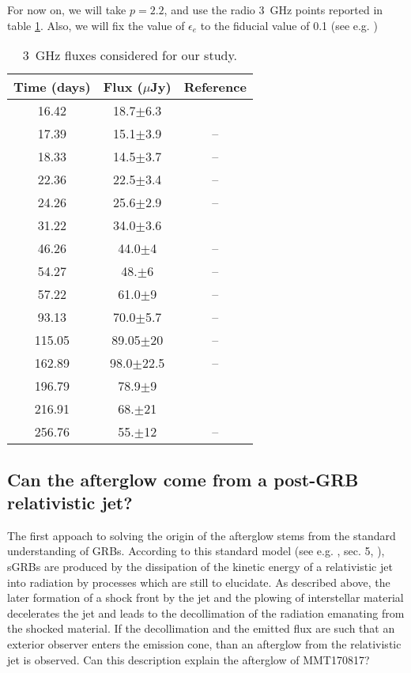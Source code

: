 For now on, we will take $p = 2.2$, and use the radio 3~GHz points reported in table \ref{radio}. Also, we will fix the value of $\epsilon_e$ to the fiducial value of 0.1 (see e.g. \cite{41})

\begin{table}
\begin{center}
\begin{tabular}{c|c|c}
\bf{Time (days)} & \bf{Flux ($\mu$Jy)} & \bf{Reference}\\
\hline
16.42 & 18.7$\pm$6.3 & \cite{12}\\
17.39 & 15.1$\pm$3.9 & --\\
18.33 & 14.5$\pm$3.7 & --\\
22.36 & 22.5$\pm$3.4 & --\\
24.26 &  25.6$\pm$2.9 & --\\
31.22 & 34.0$\pm$3.6 & \cite{5}\\
46.26 & 44.0$\pm$4 & --\\
54.27 &  48.$\pm$6 & --\\
57.22 & 61.0$\pm$9 & --\\
93.13 & 70.0$\pm$5.7 & --\\
115.05 & 89.05$\pm$20 & --\\
162.89 & 98.0$\pm$22.5 & --\\
196.79 & 78.9$\pm$9 & \cite{10}\\
216.91 & 68.$\pm$21 & \cite{17}\\
256.76 & 55.$\pm$12 & -- \\


\end{tabular}
\caption{3~GHz fluxes considered for our study.}
\label{radio}
\end{center}
\end{table}

\subsection{Can the afterglow come from a post-GRB relativistic jet?}
The first appoach to solving the origin of the afterglow stems from the standard understanding of GRBs. According to this standard model (see e.g. \cite{27}, \cite{26} sec. 5, \cite{28}), sGRBs are produced by the dissipation of the kinetic energy of a relativistic jet into radiation by processes which are still to elucidate. As described above, the later formation of a shock front by the jet and the plowing of interstellar material decelerates the jet and leads to the decollimation of the radiation emanating from the shocked material. If the decollimation and the emitted flux are such that an exterior observer enters the emission cone, than an afterglow from the relativistic jet is observed. Can this description explain the afterglow of MMT170817?


